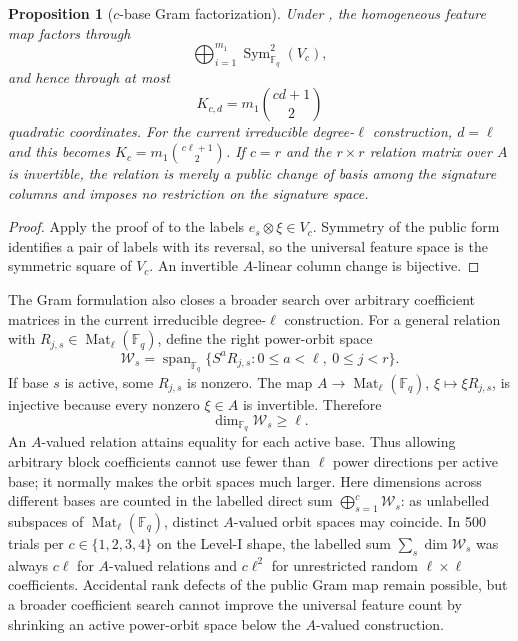 \documentclass[11pt]{article}
\newtheorem{proposition}[theorem]{Proposition}
\newcommand{\F}{\mathbb F}
\newcommand{\Mat}{\operatorname{Mat}}
\newcommand{\Sym}{\operatorname{Sym}}
\newcommand{\Span}{\operatorname{span}}
\begin{document}
\begin{proposition}[$c$-base Gram factorization]\label{prop:cbase}
Under , the homogeneous feature map factors through
\[
 \bigoplus_{i=1}^{m_1}\Sym^2_{\F_q}(V_c),
\]
and hence through at most
\[
 K_{c,d}=m_1\binom{cd+1}{2}
\]
quadratic coordinates.  For the current irreducible degree-$\ell$
construction, $d=\ell$ and this becomes
$K_c=m_1\binom{c\ell+1}{2}$.  If $c=r$ and the $r\times r$ relation matrix over
$A$ is invertible, the relation is merely a public change of basis among the
signature columns and imposes no restriction on the signature space.
\end{proposition}

\begin{proof}
Apply the proof of  to the labels
$e_s\otimes\xi\in V_c$.  Symmetry of the public form identifies a pair of
labels with its reversal, so the universal feature space is the symmetric
square of $V_c$.  An invertible $A$-linear column change is bijective.
\end{proof}

The Gram formulation also closes a broader search over arbitrary coefficient
matrices in the current irreducible degree-$\ell$ construction.  For a general
relation with $R_{j,s}\in\Mat_\ell(\F_q)$, define the right power-orbit space
\[
 \mathcal W_s=\Span_{\F_q}\{S^aR_{j,s}:0\le a<\ell,\ 0\le j<r\}.
\]
If base $s$ is active, some $R_{j,s}$ is nonzero.  The map
$A\to\Mat_\ell(\F_q)$, $\xi\mapsto\xi R_{j,s}$, is injective because every
nonzero $\xi\in A$ is invertible.  Therefore
\begin{equation}\label{eq:orbit-lower}
 \dim_{\F_q}\mathcal W_s\ge\ell.
\end{equation}
An $A$-valued relation attains equality for each active base.  Thus allowing
arbitrary block coefficients cannot use fewer than $\ell$ power directions per
active base; it normally makes the orbit spaces much larger.  Here dimensions
across different bases are counted in the labelled direct sum
$\bigoplus_{s=1}^c\mathcal W_s$: as unlabelled subspaces of
$\Mat_\ell(\F_q)$, distinct $A$-valued orbit spaces may coincide.  In 500 trials
per $c\in\{1,2,3,4\}$ on the Level-I shape, the labelled sum
$\sum_s\dim\mathcal W_s$ was always $c\ell$ for $A$-valued relations and
$c\ell^2$ for unrestricted random $\ell\times\ell$ coefficients.  Accidental
rank defects of the public Gram map remain possible, but a broader coefficient
search cannot improve the universal feature count by shrinking an active
power-orbit space below the $A$-valued construction.
\end{document}

